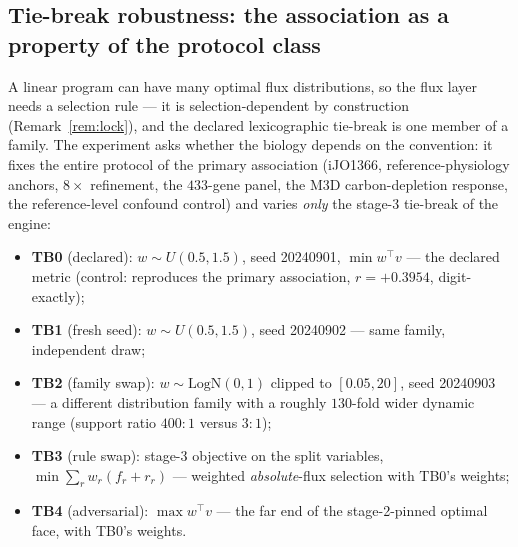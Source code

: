 \documentclass[11pt,a4paper]{article}
\theoremstyle{plain}
\theoremstyle{definition}
\theoremstyle{remark}
\begin{document}
\subsection{Tie-break robustness: the association as a property
of the protocol class}\label{sec:v8}

A linear program can have many optimal flux distributions, so the
flux layer needs a selection rule --- it is selection-dependent by
construction
(Remark~\ref{rem:lock}), and the declared lexicographic tie-break is one
member of a family. The experiment asks whether the biology depends
on the convention: it fixes the entire protocol of the primary association (iJO1366, reference-physiology anchors, $8\times$ refinement, the $433$-gene panel, the M3D carbon-depletion response, the reference-level confound control) and varies \emph{only} the stage-3 tie-break of the
engine:
\begin{itemize}
\item \textbf{TB0} (declared): $w \sim U(0.5, 1.5)$, seed 20240901,
      $\min w^\top v$ --- the declared metric (control: reproduces the
      primary association, $r = +0.3954$, digit-exactly);
\item \textbf{TB1} (fresh seed): $w \sim U(0.5, 1.5)$, seed 20240902
      --- same family, independent draw;
\item \textbf{TB2} (family swap): $w \sim \mathrm{LogN}(0, 1)$ clipped
      to $[0.05, 20]$, seed 20240903 --- a different distribution
      family with a roughly $130$-fold wider dynamic range
      (support ratio $400{:}1$ versus $3{:}1$);
\item \textbf{TB3} (rule swap): stage-3 objective on the split
      variables, $\min \sum_r w_r (f_r + r_r)$ --- weighted
      \emph{absolute}-flux selection with TB0's weights;
\item \textbf{TB4} (adversarial): $\max w^\top v$ --- the far end of
      the stage-2-pinned optimal face, with TB0's weights.
\end{itemize}
\end{document}
